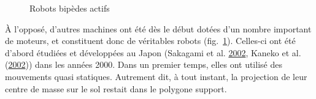 \documentclass[french,A4paper,]{book}
\begin{document}
\begin{figure}
\centering

\hspace*{\fill}
\hfill%
\hspace*{\fill}

\caption{Robots bipèdes actifs}

\label{fig:bipedespassifs}

\end{figure}

À l'opposé, d'autres machines ont été dès le début dotées d'un nombre
important de moteurs, et constituent donc de véritables robots
(fig.~\ref{fig:bipedespassifs}). Celles-ci ont été d'abord étudiées et
développées au Japon (Sakagami et al.
\protect\hyperlink{ref-sakagami02}{2002}, Kaneko et al.
(\protect\hyperlink{ref-kaneko02}{2002})) dans les années 2000. Dans un
premier temps, elles ont utilisé des mouvements quasi statiques.
Autrement dit, à tout instant, la projection de leur centre de masse sur
le sol restait dans le polygone support.
\end{document}
